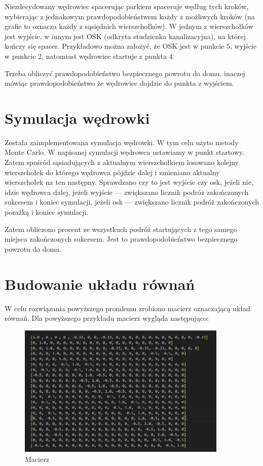 \documentclass[12pt,a4paper]{article}
\begin{document}
Niezdecydowany wędrowiec spacerując parkiem spaceruje wędług tych kroków, wybierając z jednakowym prawdopodobieństwem każdy z możliwych kroków (na grafie to oznacza każdy z sąsiędnich wierszchołków). W jednym z wierszchołków jest wyjście, w innym jest OSK (odkryta studzienka kanalizacyjna), na której kończy się spacer. Przykładowo można założyć, że OSK jest w punkcie 5, wyjście w punkcie 2, natomiast wędrowiec startuje z punkta 4. 

Trzeba obliczyć prawdopodobieństwo bezpiecznego powrotu do domu, inaczej mówiąc prawdopodobieństwo że wędrowiec dojdzie do punkta z wyjściem.

\newpage
\section{Symulacja wędrowki}
Została zaimplementowana symulacja wędrowki. W tym celu użyto metody Monte Carlo. W napisanej symulacji wędrowca ustawiamy w punkt startowy. Zatem spośród sąsiadujących z aktualnym wierszchołkiem losowano kolejny wierszchołek do którego wędrowca pójdzie dalej i zmieniano aktualny wierszchołek na ten następny. Sprawdzano czy to jest wyjście czy osk, jeżeli nie, idzie wędrowca dalej, jeżeli wyjście  --- zwiększano licznik podróż zakończonych sukcesem i koniec symulacji, jeżeli osk --- zwiększano licznik podróż zakończonych porażką i koniec symulacji.

Zatem obliczono procent ze wszystkuch podróż startujących z tego samego miejsca zakończonych sukcesem. Jest to prawdopodobieństwo bezpiecznego powrotu do doma.

\newpage
\section{Budowanie układu równań}

W celu rozwiązania powyższego promlemu zrobiono macierz oznaczającą układ równań. Dla powyższego przykładu macierz wygląda następująco:

\begin{figure}[h]
  \centering
  \includegraphics[width=10cm]{images/macierz.png}
  \caption{Macierz}
  \label{fig:macierz}
\end{figure}
\end{document}
